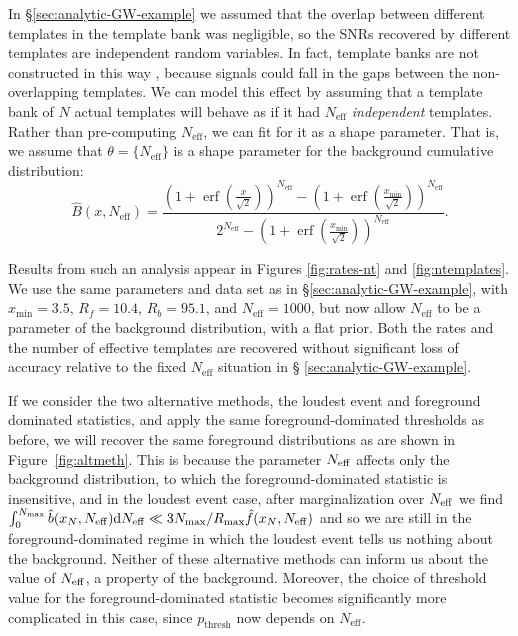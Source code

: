 \documentclass[aps,prd,reprint,nofootinbib]{revtex4-1}
\newcommand{\xmin}{x_\mathrm{min}}
\DeclareMathOperator{\erf}{erf}
\begin{document}
In \S \ref{sec:analytic-GW-example} we assumed that the overlap
between different templates in the template bank was negligible, so
the SNRs recovered by different templates are independent random
variables.  In fact, template banks are not constructed in this way
\citep[e.g.,][]{Owen:1998dk,Ajith:2008},
because signals could fall in the gaps between the non-overlapping
templates.  We can model this effect by assuming that a template bank
of $N$ actual templates will behave as if it had $N_\mathrm{eff}$
\emph{independent} templates.  Rather than pre-computing
$N_\mathrm{eff}$, we can fit for it as a shape parameter.  That is, we
assume that $\theta = \{N_\mathrm{eff}\}$ is a shape parameter for the
background cumulative distribution:
\begin{equation}
  \hat{B}\left(x, N_\mathrm{eff}\right) = \frac{\left( 1 + \erf\left(
    \frac{x}{\sqrt{2}} \right) \right)^{N_\mathrm{eff}} - \left( 1 +
    \erf\left( \frac{\xmin}{\sqrt{2}} \right)
    \right)^{N_\mathrm{eff}}}{2^{N_\mathrm{eff}} - \left( 1 +
    \erf\left( \frac{\xmin}{\sqrt{2}} \right) \right)^{N_\mathrm{eff}}
  }.
\end{equation}

Results from such an analysis appear in Figures \ref{fig:rates-nt} and
\ref{fig:ntemplates}.  We use the same parameters and data set as in
\S \ref{sec:analytic-GW-example}, with $x_\mathrm{min} = 3.5$, $R_f =
10.4$, $R_b = 95.1$, and $N_\mathrm{eff} = 1000$, but now allow
$N_\mathrm{eff}$ to be a parameter of the background distribution,
with a flat prior.  Both the rates and the number of effective
templates are recovered without significant loss of accuracy relative
to the fixed $N_\mathrm{eff}$ situation in \S
\ref{sec:analytic-GW-example}.

If we consider the two alternative methods, the loudest event and
foreground dominated statistics, and apply the same
foreground-dominated thresholds as before, we will recover the same
foreground distributions as are shown in Figure~\ref{fig:altmeth}.
This is because the parameter $N_{\rm eff}$ affects only the
background distribution, to which the foreground-dominated statistic
is insensitive, and in the loudest event case, after marginalization
over $N_{\rm eff}$ we find $\int_0^{N_{\rm max}} \hat{b}(x_N,N_{\rm
  eff}) {\rm d}N_{\rm eff} \ll 3 N_{\rm max}/R_{\rm max} \hat{f}(x_N,
N_{\rm eff})$ and so we are still in the foreground-dominated regime
in which the loudest event tells us nothing about the background.
Neither of these alternative methods can inform us about the value of
$N_{\rm eff}$, a property of the background.  Moreover, the choice of
threshold value for the foreground-dominated statistic becomes
significantly more complicated in this case, since $p_\mathrm{thresh}$
now depends on $N_\mathrm{eff}$.
\end{document}
